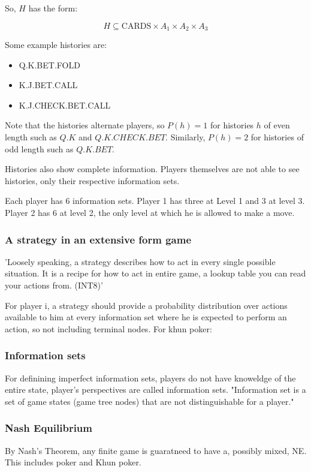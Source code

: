 \documentclass{article}
\begin{document}
So, $H$ has the form: 

\[ H \subseteq \text{CARDS} \times A_1 \times A_2 \times A_3 \]

Some example histories are: 
\begin{itemize}
\item Q.K.BET.FOLD
\item K.J.BET.CALL
\item K.J.CHECK.BET.CALL
\end{itemize}

Note that the histories alternate players, so $P(h)= 1$ for histories $h$ of even length such as $Q.K$ and $Q.K.CHECK.BET$. Similarly, $P(h) = 2$ for histories of odd length such as $Q.K.BET$.

Histories also show complete information. Players themselves are not able to see histories, only their respective information sets. 

Each player has 6 information sets. 
Player 1 has three at Level 1 and 3 at level 3. 
Player 2 has 6 at level 2, the only level at which he is allowed to make a move. 


\subsubsection{A strategy in an extensive form game}
'Loosely speaking, a strategy describes how to act in every single possible situation. It is a recipe for how to act in entire game, a lookup table you can read your actions from. (INT8)'

For player i, a strategy should provide a probability distribution over actions available to him at every information set where he is expected to perform an action, so not including terminal nodes. For khun poker: 


\subsubsection{Information sets}
For definining imperfect information sets, players do not have knoweldge of the entire state, player's perspectives are called information sets. 
"Information set is a set of game states (game tree nodes) that are not distinguishable for a player."



\subsubsection{Nash Equilibrium}
By Nash's Theorem, any finite game is guaratneed to have a, possibly mixed, NE. This includes poker and Khun poker. 
\end{document}
